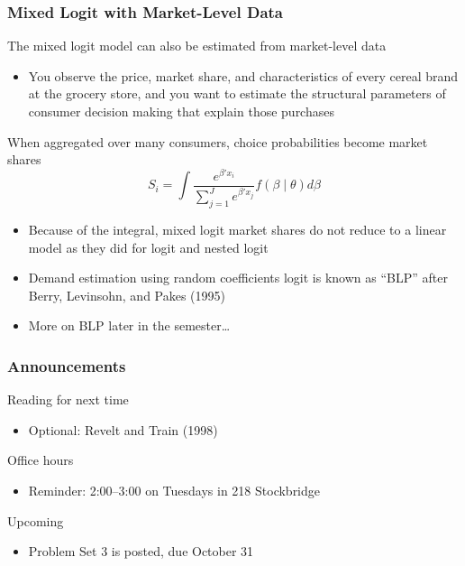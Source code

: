 \documentclass{beamer}
\begin{document}
\begin{frame}\frametitle{Mixed Logit with Market-Level Data}
    The mixed logit model can also be estimated from market-level data
    \begin{itemize}
        \item You observe the price, market share, and characteristics of every cereal brand at the grocery store, and you want to estimate the structural parameters of consumer decision making that explain those purchases
    \end{itemize}
    \vspace{2ex}
    When aggregated over many consumers, choice probabilities become market shares
    $$S_i = \int \frac{e^{\beta' x_i}}{\sum_{j = 1}^J e^{\beta' x_j}} f(\beta \mid \theta) d \beta$$
    \begin{itemize}
        \item Because of the integral, mixed logit market shares do not reduce to a linear model as they did for logit and nested logit
        \item Demand estimation using random coefficients logit is known as ``BLP'' after Berry, Levinsohn, and Pakes (1995)
        \item More on BLP later in the semester\ldots
    \end{itemize}
\end{frame}

\begin{frame}\frametitle{Announcements}
    Reading for next time
    \begin{itemize}
        \item Optional: Revelt and Train (1998)
    \end{itemize}
    \vspace{3ex}
    Office hours
    \begin{itemize}
    	\item Reminder: 2:00--3:00 on Tuesdays in 218 Stockbridge
    \end{itemize}
    \vspace{3ex}
    Upcoming
    \begin{itemize}
        \item Problem Set 3 is posted, due October 31
    \end{itemize}
\end{frame}
\end{document}
